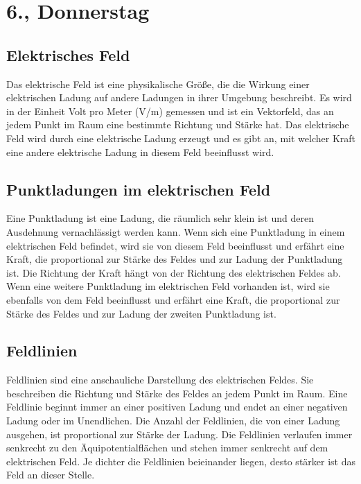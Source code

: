 \documentclass{article}
\begin{document}
\section{6., Donnerstag}
\subsection{Elektrisches Feld}
Das elektrische Feld ist eine physikalische Größe, die die Wirkung einer
elektrischen Ladung auf andere Ladungen in ihrer Umgebung beschreibt. Es wird in
der Einheit Volt pro Meter (V/m) gemessen und ist ein Vektorfeld, das an jedem
Punkt im Raum eine bestimmte Richtung und Stärke hat. Das elektrische Feld wird
durch eine elektrische Ladung erzeugt und es gibt an, mit welcher Kraft eine
andere elektrische Ladung in diesem Feld beeinflusst wird.


\subsection{Punktladungen im elektrischen Feld}
Eine Punktladung ist eine Ladung, die räumlich sehr klein ist und deren
Ausdehnung vernachlässigt werden kann. Wenn sich eine Punktladung in einem
elektrischen Feld befindet, wird sie von diesem Feld beeinflusst und erfährt
eine Kraft, die proportional zur Stärke des Feldes und zur Ladung der
Punktladung ist. Die Richtung der Kraft hängt von der Richtung des elektrischen
Feldes ab. Wenn eine weitere Punktladung im elektrischen Feld vorhanden ist,
wird sie ebenfalls von dem Feld beeinflusst und erfährt eine Kraft, die
proportional zur Stärke des Feldes und zur Ladung der zweiten Punktladung ist.


\subsection{Feldlinien}
Feldlinien sind eine anschauliche Darstellung des elektrischen Feldes. Sie
beschreiben die Richtung und Stärke des Feldes an jedem Punkt im Raum. Eine
Feldlinie beginnt immer an einer positiven Ladung und endet an einer negativen
Ladung oder im Unendlichen. Die Anzahl der Feldlinien, die von einer Ladung
ausgehen, ist proportional zur Stärke der Ladung. Die Feldlinien verlaufen immer
senkrecht zu den Äquipotentialflächen und stehen immer senkrecht auf dem
elektrischen Feld. Je dichter die Feldlinien beieinander liegen, desto stärker
ist das Feld an dieser Stelle.


\begin{center}
\end{center}
\end{document}
